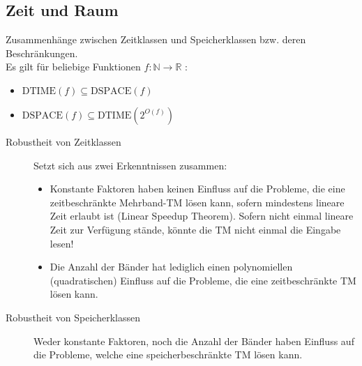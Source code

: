 \subsection{Zeit und Raum}
    Zusammenhänge zwischen Zeitklassen und Speicherklassen bzw. deren Beschränkungen.  \\
    Es gilt für beliebige Funktionen $f: \mathbb{N} \to \mathbb{R}$ :
    \begin{itemize}
        \item $\mathrm{DTIME}(f) \subseteq \mathrm{DSPACE}(f)$
        \item $\mathrm{DSPACE}(f) \subseteq \mathrm{DTIME}(2^{O(f)})$
    \end{itemize}
    \begin{description}
        \item[Robustheit von Zeitklassen] Setzt sich aus zwei Erkenntnissen zusammen:
            \begin{itemize}
                \item Konstante Faktoren haben keinen Einfluss auf die Probleme, die eine zeitbeschränkte Mehrband-TM lösen kann, sofern mindestens lineare Zeit erlaubt ist (Linear Speedup Theorem). Sofern nicht einmal lineare Zeit zur Verfügung stände, könnte die TM nicht einmal die Eingabe lesen!
                \item Die Anzahl der Bänder hat lediglich einen polynomiellen (quadratischen) Einfluss auf die Probleme, die eine zeitbeschränkte TM lösen kann.
            \end{itemize}
        \item[Robustheit von Speicherklassen] Weder konstante Faktoren, noch die Anzahl der Bänder haben Einfluss auf die Probleme, welche eine speicherbeschränkte TM lösen kann.
    \end{description}
